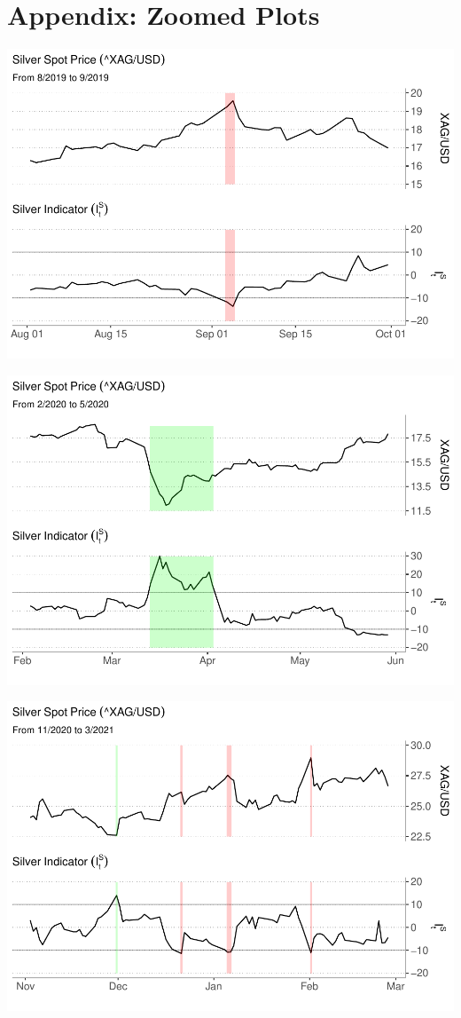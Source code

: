 \documentclass[
  12pt,
]{article}
\begin{document}
\hypertarget{appendix-zoomed-plots}{%
\section{Appendix: Zoomed Plots}\label{appendix-zoomed-plots}}

\includegraphics{silver-market-timing_files/figure-latex/highlighted-plot2-1.pdf}

\includegraphics{silver-market-timing_files/figure-latex/highlighted-plot3-1.pdf}

\includegraphics{silver-market-timing_files/figure-latex/highlighted-plot5-1.pdf}
\end{document}
